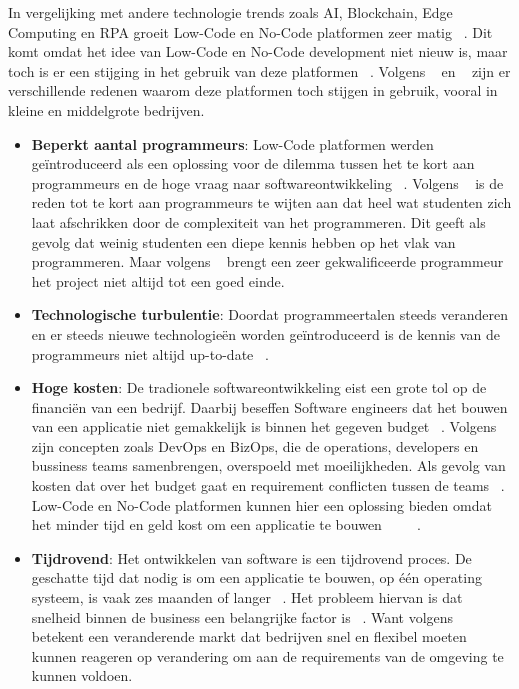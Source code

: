 In vergelijking met andere technologie trends zoals AI, Blockchain, Edge Computing en RPA groeit Low-Code en No-Code platformen zeer matig ~\autocite{Kulkarni_2021}.
Dit komt omdat het idee van Low-Code en No-Code development niet nieuw is, maar toch is er een stijging in het gebruik van deze platformen ~\autocite{Elshan2023}.
Volgens ~\textcite{Elshan2023} en ~\textcite{Kulkarni_2021} zijn er verschillende redenen waarom deze platformen toch stijgen in gebruik, vooral in kleine en middelgrote bedrijven.
\begin{itemize}
    \item \textbf{Beperkt aantal programmeurs}: 
    Low-Code platformen werden geïntroduceerd als een oplossing voor de dilemma tussen het te kort aan programmeurs en de hoge vraag naar softwareontwikkeling ~\autocite{ALSAADI_2021}. Volgens 
    ~\textcite{Moskal_2021} is de reden tot te kort aan programmeurs te wijten aan dat heel wat studenten zich laat afschrikken door de complexiteit van het programmeren. Dit geeft als gevolg dat weinig 
    studenten een diepe kennis hebben op het vlak van programmeren. Maar volgens ~\textcite{Moskal_2021} brengt een zeer gekwalificeerde programmeur het project niet altijd tot een goed einde.
    \item \textbf{Technologische turbulentie}:
    Doordat programmeertalen steeds veranderen en er steeds nieuwe technologieën worden geïntroduceerd is de kennis van de programmeurs niet altijd up-to-date ~\autocite{Moskal_2021}.
    \item \textbf{Hoge kosten}:
    De tradionele softwareontwikkeling eist een grote tol op de financiën van een bedrijf. Daarbij beseffen Software engineers dat het bouwen van een applicatie
    niet gemakkelijk is binnen het gegeven budget  ~\autocite{Moskal_2021}. Volgens ~\textcite{Elshan2023} zijn concepten zoals DevOps en BizOps, die de operations, developers en bussiness teams samenbrengen,
    overspoeld met moeilijkheden. Als gevolg van kosten dat over het budget gaat en requirement conflicten tussen de teams ~\autocite{Elshan2023}. Low-Code en No-Code platformen kunnen hier een
    oplossing bieden omdat het minder tijd en geld kost om een applicatie te bouwen ~\autocite{Elshan2023} ~\autocite{Bock_2021} ~\autocite{Rokis_2023}.
    \item \textbf{Tijdrovend}:
    Het ontwikkelen van software is een tijdrovend proces. De geschatte tijd dat nodig is om een applicatie te bouwen, op één operating systeem, is vaak
     zes maanden of langer ~\autocite{Moskal_2021}. Het probleem hiervan is dat snelheid binnen de business een belangrijke factor is ~\autocite{Sanchis_2019}.
     Want volgens ~\textcite{Sanchis_2019} betekent een veranderende markt dat bedrijven snel en flexibel moeten kunnen reageren op verandering om aan de requirements van de omgeving te kunnen voldoen.


\end{itemize}
